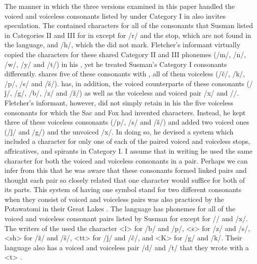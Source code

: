 \documentclass[output=paper]{LSP/langsci}
\begin{document}
The manner in which the three  versions examined in this paper handled the voiced and voiceless consonants listed by \citeauthor{Susman1939} under Category I in  also invites speculation. The   contained characters for all of the consonants that Susman listed in Categories II and III for  in  except for /r/ and the  stop, which are not found in the  language, and /h/, which the   did not mark. Fletcher's informant virtually copied the   characters for these shared Category II and III phonemes (/m/, /n/, /w/, /y/ and /t/) in his  , yet he treated Susman's Category I consonants differently.  shares five of these consonants with , all of them voiceless (/\v{c}/, /k/, /p/, /s/ and /\v{s}/).  has, in addition, the voiced counterparts of these consonants (/\v{j}/, /g/, /b/, /z/ and /\v{z}/) as well as the voiceless and voiced pair /x/ and //.  Fletcher's informant, however, did not simply retain in his   the five voiceless consonants for which the Sac and Fox had invented  characters.  Instead, he kept three of these voiceless consonants (/p/, /s/ and /\v{s}/) and added two voiced ones (/\v{j}/ and /g/) and the unvoiced /x/. In doing so, he devised a system which included a character for only one of each of the paired  voiced and voiceless stops, affricatives, and spirants in Category I. I assume that in writing he used the same character for both the voiced and voiceless consonants in a pair. Perhaps we can infer from this that he was aware that these consonants formed linked pairs and thought each pair so closely related that one  character would suffice for both of its parts. This system of having one  symbol stand for two different consonants when they consist of voiced and voiceless pairs was also practiced by the Potawatomi in their Great Lakes  . The  language has phonemes for all of the voiced and voiceless consonant pairs listed by Susman for  except for // and /x/. The writers of the   used the character <l> for /b/ and /p/, <s> for /z/ and /s/, <sh> for /\v{z}/ and /\v{s}/, <tt> for /\v{j}/ and /\v{c}/, and <K> for /g/ and /k/. Their language also has a voiced and voiceless pair /d/ and /t/ that they wrote with a <t> \citep[172, Fig. 11]{Walker1996}.  
\end{document}

